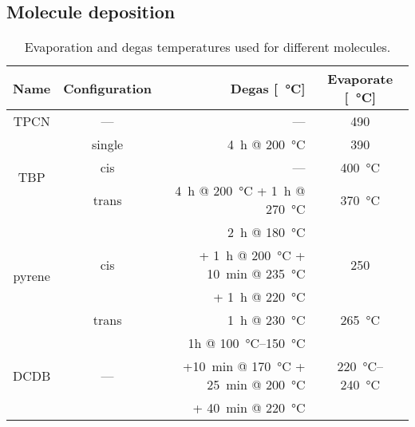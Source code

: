 \subsection{Molecule deposition}
\begin{table}\centering
	\caption{Evaporation and degas temperatures used for different molecules.}
	\begin{tabular}{ccrc}
		Name			& Configuration & Degas [\SI{}{\degreeCelsius}]	& Evaporate [\SI{}{\degreeCelsius}]	\\ \hline \hline 
		TPCN			& ---		& ---		& 490		\\ \hline 
		\multirow{3}{*}{TBP}	&single		& \SI{4}{\hour} @ \SI{200}{\degreeCelsius}& 390	\\
		&cis		& ---		& \SI{400}{\degreeCelsius}\\
		&trans		& \SI{4}{\hour} @ \SI{200}{\degreeCelsius} + \SI{1}{\hour} @ \SI{270}{\degreeCelsius}&\SI{370}{\degreeCelsius}\\ \hline 
		\multirow{4}{*}{pyrene} & \multirow{3}{*}{cis}		& \SI{2}{\hour} @ \SI{180}{\degreeCelsius}&	\multirow{3}{*}{250}	\\
		&&+ \SI{1}{\hour} @ \SI{200}{\degreeCelsius} + \SI{10}{\minute} @ \SI{235}{\degreeCelsius} 	&\\
		&&+ \SI{1}{\hour} @ \SI{220}{\degreeCelsius}&\\ 
		&trans		& \SI{1}{\hour} @ \SI{230}{\degreeCelsius}		&\SI{265}{\degreeCelsius}		\\ \hline
		\multirow{3}{*}{DCDB} & \multirow{3}{*}{---} & 1h @ \SIrange{100}{150}{\degreeCelsius}& \multirow{3}{*}{\SIrange{220}{240}{\degreeCelsius}}\\
		&&+\SI{10}{\minute} @ \SI{170}{\degreeCelsius} + \SI{25}{\minute} @ \SI{200}{\degreeCelsius} & \\
		&&+ \SI{40}{\minute} @ \SI{220}{\degreeCelsius}&\\
	\end{tabular}
	\label{tab:molecule-temperatures}
\end{table}